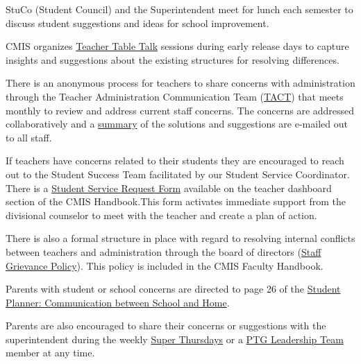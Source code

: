 \begin{findings}
StuCo (Student Council) and the Superintendent meet for lunch each semester to discuss student suggestions and ideas for school improvement.


CMIS organizes \href{https://drive.google.com/a/cmis.ac.th/file/d/0ByVFfrm0zfolWUs2RGMxczFXRXRqbDRjRlF2SGQ5cVZfV0FZ/view?usp=sharing}{Teacher Table Talk} sessions during early release days to capture insights and suggestions about the existing structures for resolving differences.

There is an anonymous process for teachers to share concerns with administration through the Teacher Administration Communication Team (\href{https://docs.google.com/a/cmis.ac.th/document/d/14nhwcw8xo3i-23Q-WUxo6KJ_c8yFKu-jTdCctt4MFcs/edit?usp=sharing}{TACT}) that meets monthly to review and address current staff concerns. The concerns are addressed collaboratively and a \href{https://docs.google.com/a/cmis.ac.th/document/d/1KLB4c5_LkxXzq4vP2EuNhBVPp2q_FT9qy1cBBwaS5JM/edit?usp=sharing}{summary} of the solutions and suggestions are e-mailed out to all staff.

If teachers have concerns related to their students they are encouraged to reach out to the Student Success Team facilitated by our Student Service Coordinator. There is a \href{https://docs.google.com/a/cmis.ac.th/forms/d/e/1FAIpQLScVtFtaEXarGOjwsiJyGdbLAMbeNzG9m44i1fWXFLbtMKZcUg/viewform}{Student Service Request Form} available on the teacher dashboard section of the CMIS Handbook.This form activates immediate support from the divisional counselor to meet with the teacher and create a plan of action.

There is also a formal structure in place with regard to resolving internal conflicts between teachers and administration  through the board of directors (\href{https://docs.google.com/a/cmis.ac.th/document/d/1RRBuWgqIb-BlwD8vTRrTG0u_FCHgQFD_oEbvseNdAPc/edit?usp=sharing}{Staff Grievance Policy}). This policy is included in the CMIS Faculty Handbook.

Parents with student or school concerns are directed to page 26 of the \href{https://docs.google.com/document/d/1bIbV9pgGz2vpXYJdnRzL_Od5PS35egy7lgBOBuszgD4/edit}{Student Planner: Communication between School and Home}. 

Parents are also encouraged to share their concerns or suggestions with the superintendent during the weekly \href{http://blogs.cmis.ac.th/newsletter/2016/09/05/super-thursdays-starts-this-week/}{Super Thursdays} or a \href{http://blogs.cmis.ac.th/ptg/about/}{PTG Leadership Team} member at any time. 


\end{findings}
